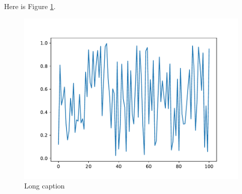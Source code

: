 \documentclass[../main.tex]{subfiles}
\begin{document}
Here is Figure \ref{ch2:fig:figure1}.

\begin{figure}[t]
    \includegraphics[width=12cm]{"Figure_1"}
	
	\caption[Short caption]{Long caption}
	
	\label{ch2:fig:figure1}
\end{figure}

\biblio
\end{document}
